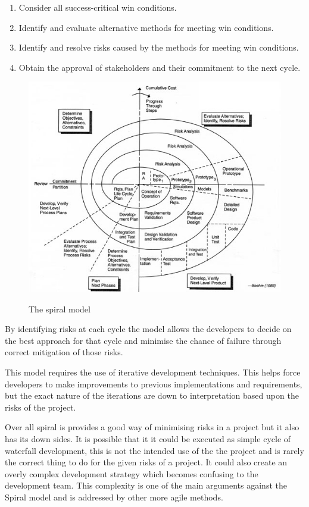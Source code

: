\documentclass[11pt,a4paper]{article}
\begin{document}
\begin{enumerate}
  \item Consider all success-critical win conditions.
  \item Identify and evaluate alternative methods for meeting win conditions.
  \item Identify and resolve risks caused by the methods for meeting win conditions. 
  \item Obtain the approval of stakeholders and their commitment to the next cycle. 
\end{enumerate}

\begin{figure}[H]
\begin{center}
\includegraphics[scale=2.5]{spiral.jpeg}
\label{img:spiral}
\caption{The spiral model \cite{spiral}}
\end{center}
\end{figure}

By identifying risks at each cycle the model allows the developers to decide on the best approach for that cycle and minimise the chance of failure through correct mitigation of those risks. 

This model requires the use of iterative development techniques. This helps force developers to make improvements to previous implementations and requirements, but the exact nature of the iterations are down to interpretation based upon the risks of the project.

Over all spiral is provides a good way of minimising risks in a project but it also has its down sides. It is possible that it it could be executed as simple cycle of waterfall development, this is not the intended use of the the project and is rarely the correct thing to do for the given risks of a project. It could also create an overly complex development strategy which becomes confusing to the development team. This complexity is one of the main arguments against the Spiral model and is addressed by other more agile methods. 
\end{document}
